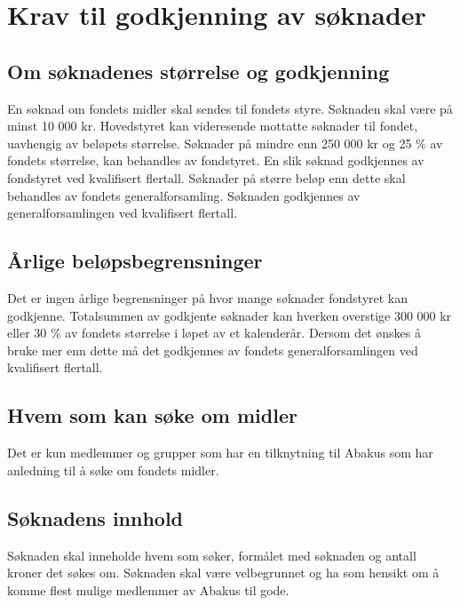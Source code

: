\section{Krav til godkjenning av søknader}
\subsection{Om søknadenes størrelse og godkjenning}
En søknad om fondets midler skal sendes til fondets styre. Søknaden skal være
på minst 10 000 kr. Hovedstyret kan videresende mottatte søknader til fondet,
uavhengig av beløpets størrelse. Søknader på mindre enn 250 000 kr og 25 \% av
fondets størrelse, kan behandles av fondstyret. En slik søknad godkjennes av
fondstyret ved kvalifisert flertall. Søknader på
større beløp enn dette skal behandles av fondets generalforsamling. Søknaden
godkjennes av generalforsamlingen ved kvalifisert flertall.

\subsection{Årlige beløpsbegrensninger}
Det er ingen årlige begrensninger på hvor mange søknader fondstyret kan
godkjenne. Totalsummen av godkjente søknader kan hverken overstige 300 000 kr
eller 30 \% av fondets størrelse i løpet av et kalenderår. Dersom det ønskes å
bruke mer enn dette må det godkjennes av fondets generalforsamlingen ved
kvalifisert flertall.

\subsection{Hvem som kan søke om midler}
Det er kun medlemmer og  grupper som har en tilknytning til Abakus som har
anledning til å søke om fondets midler.

\subsection{Søknadens innhold}
Søknaden skal inneholde hvem som søker, formålet med søknaden og antall kroner
det søkes om. Søknaden skal være velbegrunnet og ha som hensikt om å komme
flest mulige medlemmer av Abakus til gode. 
